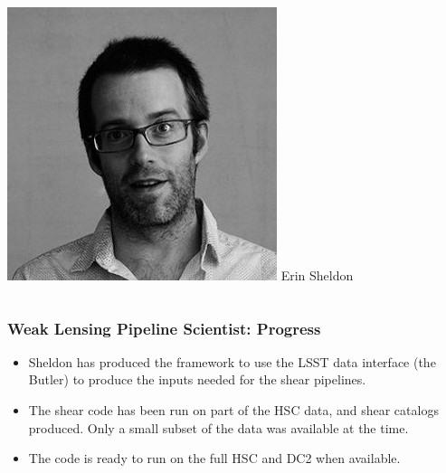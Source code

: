 \documentclass[aspectratio=169]{beamer}
\begin{document}
{\begin{columns}
        \begin{column}{0.3\textwidth}
            \begin{center}
                \includegraphics[width=\textwidth]{sheldon.png}
                \newline
                {\tiny Erin Sheldon}
            \end{center}
        \end{column}

    \end{columns}

}

\frame
{

    \frametitle{Weak Lensing Pipeline Scientist: Progress}


    \begin{itemize}

        \item Sheldon has produced the framework to
            use the LSST data interface (the Butler) to
            produce the inputs needed for the shear
            pipelines.

        \item The shear code has been run on part of the HSC data, and shear
            catalogs produced.  Only a small subset of the data was available
            at the time.

        \item The code is ready to run on the full HSC and DC2 when available.

    \end{itemize}
}
\end{document}

